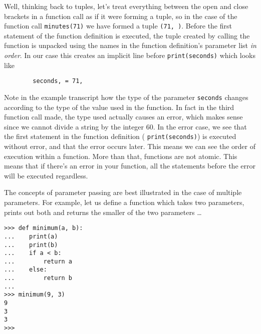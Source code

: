 Well, thinking back to tuples, let's treat everything between the   open and close brackets in a function call as if it were forming a   tuple, so in the case of the function call 
\texttt{minutes(71)} we   have formed a tuple \texttt{(71, )}. Before the first statement of the   function definition is executed, the tuple created by calling the   function is unpacked using the names in the function definition's   parameter list \textit{in order}. In our case this creates an   implicit line before 
\texttt{print(seconds)} which looks like
\begin{lstlisting}
		seconds, = 71,
\end{lstlisting}

Note in the example transcript how the type of the parameter   \texttt{seconds} changes according to the type of the value used in the   function. In fact in the third function call made, the type used   actually causes an error, which makes sense since we cannot divide a   string by the integer 60. In the error case, we see that the first   statement in the function definition (
\texttt{print(seconds)}) is   executed without error, and that the error occurs later. This means we can see the order of execution within a function.     More than that, functions are not atomic. This means that if there's an error in your function, all the      statements before the error will be executed regardless.

The concepts of parameter passing are best illustrated in the case   of multiple parameters. For example, let us define a function which   takes two parameters, prints out both and returns the smaller of the two parameters \ldots
\begin{lstlisting}
>>> def minimum(a, b):
...    print(a)
...    print(b)
...    if a < b:
...        return a
...    else:
...        return b
...
>>> minimum(9, 3)
9
3
3
>>>
\end{lstlisting}

